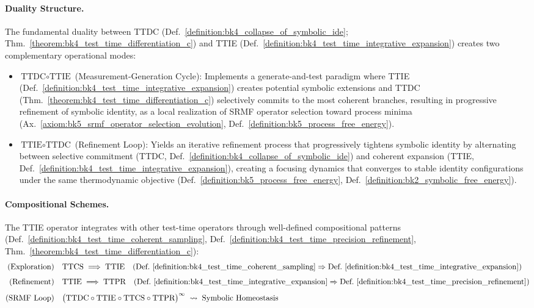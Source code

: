 \paragraph{Duality Structure.}
The fundamental duality between TTDC (Def.~\ref{definition:bk4_collapse_of_symbolic_ide}; Thm.~\ref{theorem:bk4_test_time_differentiation_c}) and TTIE (Def.~\ref{definition:bk4_test_time_integrative_expansion}) creates two complementary operational modes:
\begin{itemize}
\item $\text{TTDC}\circ\text{TTIE}$ (Measurement-Generation Cycle): Implements a generate-and-test paradigm where TTIE (Def.~\ref{definition:bk4_test_time_integrative_expansion}) creates potential symbolic extensions and TTDC (Thm.~\ref{theorem:bk4_test_time_differentiation_c}) selectively commits to the most coherent branches, resulting in progressive refinement of symbolic identity, as a local realization of SRMF operator selection toward process minima (Ax.~\ref{axiom:bk5_srmf_operator_selection_evolution}, Def.~\ref{definition:bk5_process_free_energy}).
\item $\text{TTIE}\circ\text{TTDC}$ (Refinement Loop): Yields an iterative refinement process that progressively tightens symbolic identity by alternating between selective commitment (TTDC, Def.~\ref{definition:bk4_collapse_of_symbolic_ide}) and coherent expansion (TTIE, Def.~\ref{definition:bk4_test_time_integrative_expansion}), creating a focusing dynamics that converges to stable identity configurations under the same thermodynamic objective (Def.~\ref{definition:bk5_process_free_energy}, Def.~\ref{definition:bk2_symbolic_free_energy}).
\end{itemize}

\paragraph{Compositional Schemes.}
The TTIE operator integrates with other test-time operators through well-defined compositional patterns (Def.~\ref{definition:bk4_test_time_coherent_sampling}, Def.~\ref{definition:bk4_test_time_precision_refinement}, Thm.~\ref{theorem:bk4_test_time_differentiation_c}):
\begin{align}
\text{(Exploration)}\quad
& \text{TTCS}\;\Longrightarrow\;\text{TTIE} \quad (\text{Def.~\ref{definition:bk4_test_time_coherent_sampling}}\Rightarrow\text{Def.~\ref{definition:bk4_test_time_integrative_expansion}}) \\[4pt]
\text{(Refinement)}\quad
& \text{TTIE}\;\Longrightarrow\;\text{TTPR} \quad (\text{Def.~\ref{definition:bk4_test_time_integrative_expansion}}\Rightarrow\text{Def.~\ref{definition:bk4_test_time_precision_refinement}}) \\[4pt]
\text{(SRMF Loop)}\quad
& \bigl(\text{TTDC}\circ\text{TTIE}\circ\text{TTCS}\circ\text{TTPR}\bigr)^{\infty}
        \;\rightsquigarrow\;
        \text{Symbolic Homeostasis}
\end{align}


